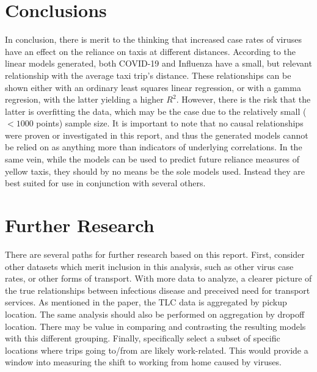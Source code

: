 \documentclass[11pt]{article}
\begin{document}

\section{Conclusions}

In conclusion, there is merit to the thinking that increased case rates of viruses 
have an effect on the reliance on taxis at different distances.
According to the linear models generated, 
both COVID-19 and Influenza have a small, but relevant relationship with the average taxi trip's distance.
These relationships can be shown either with an ordinary least squares linear regression,
or with a gamma regresion, with the latter yielding a higher $R^2$.
However, there is the risk that the latter is overfitting the data,
which may be the case due to the relatively small ($< 1000$ points) sample size.
It is important to note that no causal relationships were proven or investigated in this report,
and thus the generated models cannot be relied on as anything more than indicators
of underlying correlations. In the same vein, 
while the models can be used to predict future reliance measures of yellow taxis,
they should by no means be the sole models used. 
Instead they are best suited for use in conjunction with several others.



\section{Further Research}
There are several paths for further research based on this report.
First, consider other datasets which merit inclusion
in this analysis, such as other virus case rates, or other forms of transport.
With more data to analyze, a clearer picture of the true relationships between infectious disease and preceived need for transport services.
As mentioned in the paper, the TLC data is aggregated by pickup location.
    The same analysis should also be performed on aggregation by dropoff location.
    There may be value in comparing and contrasting the resulting models with this different grouping.
Finally, specifically select a subset of specific locations where trips going to/from are likely work-related. 
This would provide a window into measuring the shift to working from home caused by viruses.


\clearpage

\printbibliography
\end{document}
